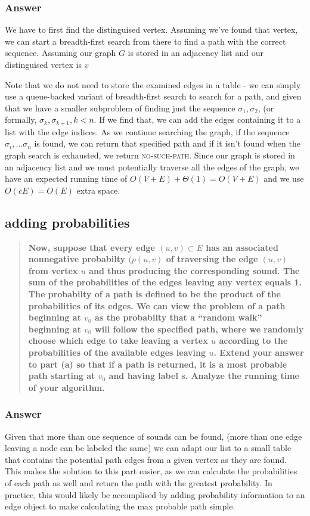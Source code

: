 \documentclass[titlepage]{article}\usepackage[]{graphicx}\usepackage[]{color}
\begin{document}
\subsubsection{Answer}
We have to first find the distinguised vertex. Assuming we've found that
vertex, we can start a breadth-first search from there to find a path with the
correct sequence. Assuming our graph $G$ is stored in an adjacency list and our
distinguised vertex is $v$

Note that we do not need to store the examined edges in a table - we can simply
use a queue-backed variant of breadth-first search to search for a path, and
given that we have a smaller subproblem of finding just the sequence $\sigma_1,
\sigma_2$, (or formally, $\sigma_k, \sigma_{k+1}, k<n$. If we find that, we can add the edges containing it to a list with
the edge indices. As we continue searching the graph, if the sequence
$\sigma_i, \dots \sigma_n$ is found, we can return that specified path and if
it isn't found when the graph search is exhausted, we return
\textsc{no-such-path}. 
Since our graph is stored in an adjacency list and we must potentially traverse
all the edges of the graph, we have an expected running time of $O(V+E) +
\Theta(1)= O(V+E) $ and we use $O(cE) = O(E) $ extra space.
  	
\subsection{adding probabilities}

\begin{quote}
	\textbf{Now, suppose that every edge $(u,v) \subset E$ has an associated
		nonnegative probabilty $(p(u,v)$ of traversing the edge $(u,v)$ from
		vertex $u$ and thus producing the corresponding sound. The sum of the
		probabilities of the edges leaving any vertex equals 1. The probabilty of
		a path is defined to be the product of the probabilities of its edges. We
		can view the problem of a path beginning at $v_0$ as the probabilty that a
		``random walk'' beginning at $v_0$  will follow the specified path, where
		we randomly choose which edge to take leaving a vertex  $u$ according to
		the probabilities of the available edges leaving $u$. 
		Extend your answer to part (a) so that if a path is returned,
		it is a most probable path starting at $v_0$ and having label s. Analyze
	the running time of your algorithm. }
\end{quote}

\subsubsection{Answer}
Given that more than one sequence of sounds can be found, (more than one edge
leaving a node can be labeled the same) we can adapt our list to a small table
that contains the potential path edges from a given vertex as they are found.
This makes the solution to this part easier, as we can calculate the
probabilities of each path as well and return the path with the greatest
probability. In practice, this would likely be accomplised by adding
probability information to an edge object to make calculating the max probable
path simple.
\end{document}
